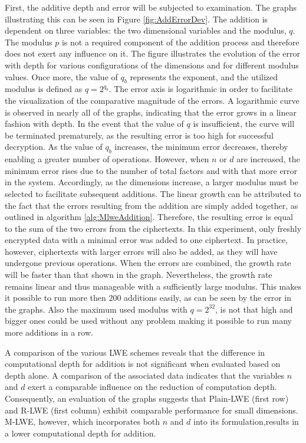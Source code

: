 First, the additive depth and error will be subjected to examination. The graphs illustrating this can be seen in Figure \ref{fig:AddErrorDev}. The addition is dependent on three variables: the two dimensional variables and the modulus, $q$. The modulus $p$ is not a required component of the addition process and therefore does not exert any influence on it. The figure illustrates the evolution of the error with depth for various configurations of the dimensions and for different modulus values. Once more, the value of $q_b$ represents the exponent, and the utilized modulus is defined as $q = 2^{q_b}$. The error axis is logarithmic in order to facilitate the visualization of the comparative magnitude of the errors. A logarithmic curve is observed in nearly all of the graphs, indicating that the error grows in a linear fashion with depth. In the event that the value of $q$ is insufficient, the curve will be terminated prematurely, as the resulting error is too high for successful decryption. As the value of $q_b$ increases, the minimum error decreases, thereby enabling a greater number of operations. However, when $n$ or $d$ are increased, the minimum error rises due to the number of total factors and with that more error in the system. Accordingly, as the dimensions increase, a larger modulus must be selected to facilitate subsequent additions. The linear growth can be attributed to the fact that the errors resulting from the addition are simply added together, as outlined in algorithm \ref{alg:MlweAddition}. Therefore, the resulting error is equal to the sum of the two errors from the ciphertexts. In this experiment, only freshly encrypted data with a minimal error was added to one ciphertext. In practice, however, ciphertexts with larger errors will also be added, as they will have undergone previous operations. When the errors are combined, the growth rate will be faster than that shown in the graph. Nevertheless, the growth rate remains linear and thus manageable with a sufficiently large modulus. This makes it possible to run more then $200$ additions easily, as can be seen by the error in the graphs. Also the maximum used modulus with $q = 2^{32}$, is not that high and bigger ones could be used without any problem making it possible to run many more additions in a row.

A comparison of the various LWE schemes reveals that the difference in computational depth for addition is not significant when evaluated based on depth alone. A comparison of the associated data indicates that the variables $n$ and $d$ exert a comparable influence on the reduction of computation depth. Consequently, an evaluation of the graphs suggests that Plain-LWE (first row) and R-LWE (first column) exhibit comparable performance for small dimensions. M-LWE, however, which incorporates both $n$ and $d$ into its formulation,results in a lower computational depth for addition.

